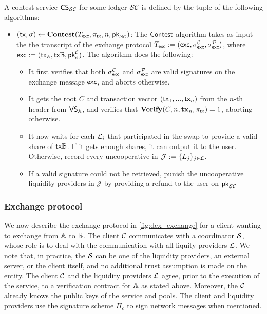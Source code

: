 \begin{definition}
A contest service $\mathsf{CS}_{\mathcal{SC}}$ for some ledger $\mathcal{SC}$ is defined by the tuple of the following algorithms:
\begin{itemize}[topsep=0pt, itemsep=0pt, leftmargin=2em]
    \item $(\mathsf{tx}, \sigma) \gets \mathbf{Contest}(T_{\mathsf{exc}}, \pi_{\mathsf{tx}}, n, \mathsf{pk}_{\mathcal{SC}})$: The $\mathsf{Contest}$ algorithm takes as input the the transcript of the exchange protocol $T_{\mathsf{exc}} := (\mathsf{exc}, \sigma^{\mathcal{C}}_{\mathsf{exc}}, \sigma^{\mathcal{P}}_{\mathsf{exc}})$, where $\mathsf{exc} := (\mathsf{tx}_{\mathbb{A}}, \mathsf{tx}{\mathbb{B}}, \mathsf{pk}_c^{\mathcal{C}})$. The algorithm does the following:
    \begin{itemize}
    \item It first verifies that both $\sigma^{\mathcal{C}}_{\mathsf{exc}}$ and $\sigma^{\mathcal{P}}_{\mathsf{exc}}$ are valid signatures on the exchange message $\mathsf{exc}$, and aborts otherwise.
    \item It gets the root $C$ and transaction vector $(\mathsf{tx}_1, ..., \mathsf{tx}_n)$ from the $n$-th header from $\mathsf{VS}_{\mathbb{A}}$, and verifies that $\textbf{Verify}(C, n, \mathbf{tx}_n, \pi_{\mathsf{tx}}) = 1$, aborting otherwise.
    \item It now waits for each $\mathcal{L}_i$ that participated in the swap to provide a valid share of $\mathsf{tx}{\mathbb{B}}$. If it gets enough shares, it can output it to the user. Otherwise, record every uncooperative in $\mathcal{J} := \{ L_j \}_{j \in \mathcal{L}}$.
    \item If a valid signature could not be retrieved, punish the uncooperative liquidity providers in $\mathcal{J}$ by providing a refund to the user on $\mathsf{pk}_{\mathcal{SC}}$
    \end{itemize}
\end{itemize}
\end{definition}

\subsubsection{Exchange protocol}

We now describe the exchange protocol in \cref{fig:dex_exchange} for a client wanting to exchange from $\mathbb{A}$ to $\mathbb{B}$. The client $\mathcal{C}$ communicates with a coordinator $\mathcal{S}$, whose role is to deal with the communication with all liquity providers $\mathcal{L}$. We note that, in practice, the $\mathcal{S}$ can be one of the liquidity providers, an external server, or the client itself, and no additional trust assumption is made on the entity.
The client $\mathcal{C}$ and the liquidity providers $\mathcal{L}$ agree, prior to the execution of the service, to a verification contract for $\mathbb{A}$ as stated above. Moreover, the $\mathcal{C}$ already knows the public keys of the service and pools. The client and liquidity providers use the signature scheme $\Pi_c$ to sign network messages when mentioned.

